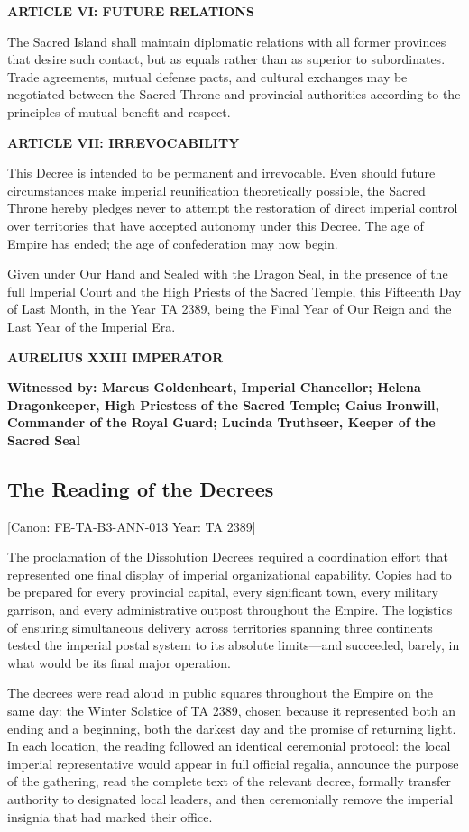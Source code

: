 \textbf{\textbf{ARTICLE VI: FUTURE RELATIONS}}

The Sacred Island shall maintain diplomatic relations with all former
provinces that desire such contact, but as equals rather than as
superior to subordinates. Trade agreements, mutual defense pacts, and
cultural exchanges may be negotiated between the Sacred Throne and
provincial authorities according to the principles of mutual benefit and
respect.

\textbf{\textbf{ARTICLE VII: IRREVOCABILITY}}

This Decree is intended to be permanent and irrevocable. Even should
future circumstances make imperial reunification theoretically possible,
the Sacred Throne hereby pledges never to attempt the restoration of
direct imperial control over territories that have accepted autonomy
under this Decree. The age of Empire has ended; the age of confederation
may now begin.

Given under Our Hand and Sealed with the Dragon Seal, in the presence of
the full Imperial Court and the High Priests of the Sacred Temple, this
Fifteenth Day of Last Month, in the Year TA 2389, being the Final Year
of Our Reign and the Last Year of the Imperial Era.

\textbf{AURELIUS XXIII IMPERATOR}

\textbf{Witnessed by: Marcus Goldenheart, Imperial Chancellor; Helena
Dragonkeeper, High Priestess of the Sacred Temple; Gaius Ironwill,
Commander of the Royal Guard; Lucinda Truthseer, Keeper of the Sacred
Seal}

\subsection{The Reading of the
Decrees}\label{the-reading-of-the-decrees}

{[}Canon: FE-TA-B3-ANN-013 \textbar{} Year: TA 2389{]}

The proclamation of the Dissolution Decrees required a coordination
effort that represented one final display of imperial organizational
capability. Copies had to be prepared for every provincial capital,
every significant town, every military garrison, and every
administrative outpost throughout the Empire. The logistics of ensuring
simultaneous delivery across territories spanning three continents
tested the imperial postal system to its absolute limits---and
succeeded, barely, in what would be its final major operation.

The decrees were read aloud in public squares throughout the Empire on
the same day: the Winter Solstice of TA 2389, chosen because it
represented both an ending and a beginning, both the darkest day and the
promise of returning light. In each location, the reading followed an
identical ceremonial protocol: the local imperial representative would
appear in full official regalia, announce the purpose of the gathering,
read the complete text of the relevant decree, formally transfer
authority to designated local leaders, and then ceremonially remove the
imperial insignia that had marked their office.

